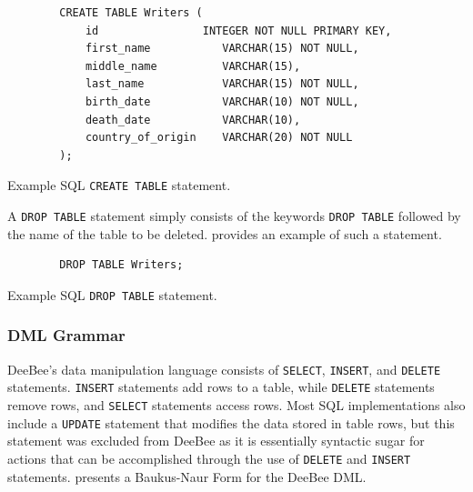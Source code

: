 \begin{listing}[h]
    \begin{verbatim}
        CREATE TABLE Writers (
            id           	  INTEGER NOT NULL PRIMARY KEY,
            first_name           VARCHAR(15) NOT NULL,
            middle_name          VARCHAR(15),
            last_name            VARCHAR(15) NOT NULL,
            birth_date           VARCHAR(10) NOT NULL,
            death_date           VARCHAR(10),
            country_of_origin    VARCHAR(20) NOT NULL
        );
\end{verbatim}
\caption{Example SQL \texttt{CREATE TABLE} statement.}
\label{lst:create}
\end{listing}

A \texttt{DROP TABLE} statement simply consists of the keywords \texttt{DROP TABLE} followed by the name of the table to be deleted.  provides an example of such a statement.

\begin{listing}[h]
    \begin{verbatim}
        DROP TABLE Writers;
\end{verbatim}
\caption{Example SQL \texttt{DROP TABLE} statement.}
\label{lst:drop}
\end{listing}

\subsubsection{DML Grammar}

DeeBee's data manipulation language consists of \texttt{SELECT}, \texttt{INSERT}, and \texttt{DELETE} statements. \texttt{INSERT} statements add rows to a table, while \texttt{DELETE} statements remove rows, and \texttt{SELECT} statements access rows. Most SQL implementations also include a \texttt{UPDATE} statement that modifies the data stored in table rows, but this statement was excluded from DeeBee as it is essentially syntactic sugar for actions that can be accomplished through the use of \texttt{DELETE} and \texttt{INSERT} statements.  presents a Baukus-Naur Form for the DeeBee DML.

